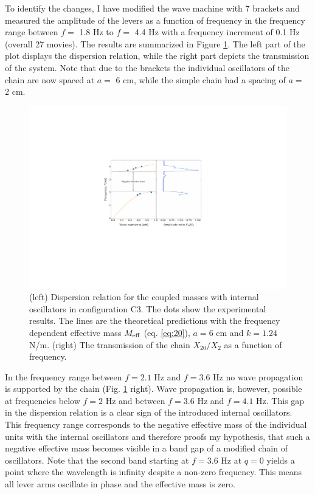 \documentclass[12pt]{article}
\begin{document}
To identify the changes, I have modified the wave machine with 7 brackets and measured the amplitude of the levers as a function of frequency in the frequency range between $f=$ 1.8 Hz to $f=$ 4.4 Hz with a frequency increment of 0.1 Hz (overall 27 movies).
The results are summarized in Figure \ref{fig:figure20}. The left part of the plot displays the dispersion relation, while the right part depicts the transmission of the system. Note that due to the brackets the individual oscillators of the chain are now spaced at $a=$ 6 cm, while the simple chain had a spacing of $a=$ 2 cm. 
\begin{figure}[hbt]
  \includegraphics[width=.7\columnwidth]{results/condition3_dispersion_transmission.pdf}
  \caption{(left) Dispersion relation for the coupled masses with internal oscillators in configuration C3. The dots show the experimental results. The lines are the theoretical predictions with the frequency dependent effective mass $M_{\rm eff}$ (eq. \ref{eq:20}), $a=6$ cm and $k=1.24$ N/m. (right) The transmission of the chain $X_{20}/X_{2}$ as a function of frequency.}\label{fig:figure20}
\end{figure}
In the frequency range between $f=2.1$ Hz and $f=3.6$ Hz no wave propagation is supported by the chain (Fig. \ref{fig:figure20} right). Wave propagation is, however, possible at frequencies below $f=2$ Hz and between $f=3.6$ Hz and $f=4.1$ Hz. This gap in the dispersion relation is a clear sign of the introduced internal oscillators. This frequency range corresponds to the negative effective mass of the individual units with the internal oscillators and therefore proofs my hypothesis, that such a negative effective mass becomes visible in a band gap of a modified chain of oscillators. Note that the second band starting at $f=3.6$ Hz at $q=0$ yields a point where the wavelength is infinity despite a non-zero frequency. This means all lever arms oscillate in phase and the effective mass is zero. 
\end{document}
